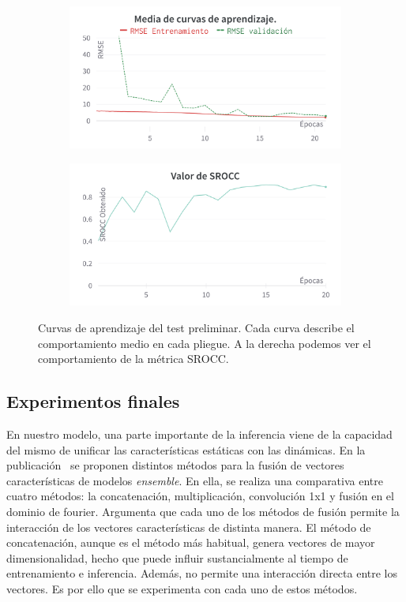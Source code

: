 \begin{figure}[htp]
  \begin{subfigure}[b]{0.49\textwidth}
  \centering
    \includegraphics[width=\textwidth]{imagenes/chapter5/PreTestCurves.png}
  \end{subfigure}
  \begin{subfigure}[b]{0.49\textwidth}
  \centering
    \includegraphics[width=\textwidth]{imagenes/chapter5/PreTestSROCC.png}
  \end{subfigure}
  \caption[Curvas de aprendizaje del test preliminar.]{Curvas de aprendizaje del test preliminar. 
  Cada curva describe el comportamiento medio en cada pliegue. A la derecha 
  podemos ver el comportamiento de la métrica SROCC.
} \label{fig:PreTestCurves}
\end{figure}


\subsection{Experimentos finales}
En nuestro modelo, una parte importante de la inferencia viene de la capacidad del mismo de unificar las características 
estáticas con las dinámicas. En la publicación~\cite{EnsemblePCQA} se proponen distintos métodos para la fusión
de vectores características de modelos \emph{ensemble}.
En ella, se realiza una comparativa entre cuatro métodos: la concatenación, multiplicación, convolución 1x1 y 
fusión en el dominio de fourier. 
Argumenta que cada uno de los métodos de fusión permite la interacción de los vectores 
características de distinta manera. El método de concatenación, aunque es el método 
más habitual, genera vectores de mayor dimensionalidad, hecho que puede influir 
sustancialmente al tiempo de entrenamiento e inferencia. Además, no permite una interacción directa entre los vectores. 
Es por ello que se experimenta con cada uno de estos métodos.  

